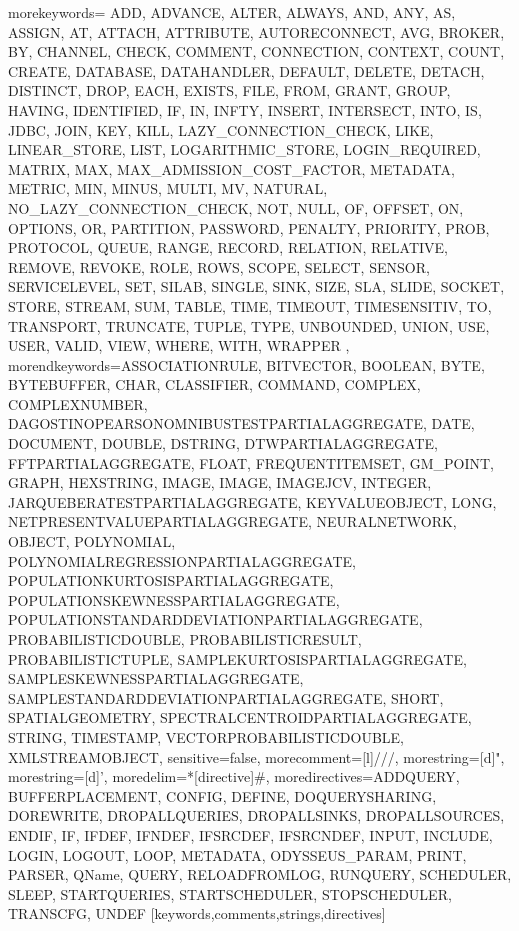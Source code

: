 %
   {morekeywords={%
ADD, ADVANCE, ALTER, ALWAYS, AND, ANY, AS, ASSIGN, AT, ATTACH, ATTRIBUTE, AUTORECONNECT, AVG, BROKER, BY, CHANNEL, CHECK, COMMENT, CONNECTION, CONTEXT, COUNT, CREATE, DATABASE, DATAHANDLER, DEFAULT, DELETE, DETACH, DISTINCT, DROP, EACH, EXISTS, FILE, FROM, GRANT, GROUP, HAVING, IDENTIFIED, IF, IN, INFTY, INSERT, INTERSECT, INTO, IS, JDBC, JOIN, KEY, KILL, LAZY_CONNECTION_CHECK, LIKE, LINEAR_STORE, LIST, LOGARITHMIC_STORE, LOGIN_REQUIRED, MATRIX, MAX, MAX_ADMISSION_COST_FACTOR, METADATA, METRIC, MIN, MINUS, MULTI, MV, NATURAL, NO_LAZY_CONNECTION_CHECK, NOT, NULL, OF, OFFSET, ON, OPTIONS, OR, PARTITION, PASSWORD, PENALTY, PRIORITY, PROB, PROTOCOL, QUEUE, RANGE, RECORD, RELATION, RELATIVE, REMOVE, REVOKE, ROLE, ROWS, SCOPE, SELECT, SENSOR, SERVICELEVEL, SET, SILAB, SINGLE, SINK, SIZE, SLA, SLIDE, SOCKET, STORE, STREAM, SUM, TABLE, TIME, TIMEOUT, TIMESENSITIV, TO, TRANSPORT, TRUNCATE, TUPLE, TYPE, UNBOUNDED, UNION, USE, USER, VALID, VIEW, WHERE, WITH, WRAPPER%
      },%
   morendkeywords={ASSOCIATIONRULE, BITVECTOR, BOOLEAN, BYTE, BYTEBUFFER, CHAR, CLASSIFIER, COMMAND, COMPLEX, COMPLEXNUMBER, DAGOSTINOPEARSONOMNIBUSTESTPARTIALAGGREGATE, DATE, DOCUMENT, DOUBLE, DSTRING, DTWPARTIALAGGREGATE, FFTPARTIALAGGREGATE, FLOAT, FREQUENTITEMSET, GM_POINT, GRAPH, HEXSTRING, IMAGE, IMAGE, IMAGEJCV, INTEGER, JARQUEBERATESTPARTIALAGGREGATE, KEYVALUEOBJECT, LONG, NETPRESENTVALUEPARTIALAGGREGATE, NEURALNETWORK, OBJECT, POLYNOMIAL, POLYNOMIALREGRESSIONPARTIALAGGREGATE, POPULATIONKURTOSISPARTIALAGGREGATE, POPULATIONSKEWNESSPARTIALAGGREGATE, POPULATIONSTANDARDDEVIATIONPARTIALAGGREGATE, PROBABILISTICDOUBLE, PROBABILISTICRESULT, PROBABILISTICTUPLE, SAMPLEKURTOSISPARTIALAGGREGATE, SAMPLESKEWNESSPARTIALAGGREGATE, SAMPLESTANDARDDEVIATIONPARTIALAGGREGATE, SHORT, SPATIALGEOMETRY, SPECTRALCENTROIDPARTIALAGGREGATE, STRING, TIMESTAMP, VECTORPROBABILISTICDOUBLE, XMLSTREAMOBJECT},%
   sensitive=false,
   morecomment=[l]///,%
   morestring=[d]",%
   morestring=[d]',%
   moredelim=*[directive]\#,%
   moredirectives={ADDQUERY, BUFFERPLACEMENT, CONFIG, DEFINE, DOQUERYSHARING, DOREWRITE, DROPALLQUERIES, DROPALLSINKS, DROPALLSOURCES, ENDIF, IF, IFDEF, IFNDEF, IFSRCDEF, IFSRCNDEF, INPUT, INCLUDE, LOGIN, LOGOUT, LOOP, METADATA, ODYSSEUS_PARAM, PRINT, PARSER, QName, QUERY, RELOADFROMLOG, RUNQUERY, SCHEDULER, SLEEP, STARTQUERIES, STARTSCHEDULER, STOPSCHEDULER, TRANSCFG, UNDEF}%
}[keywords,comments,strings,directives]

